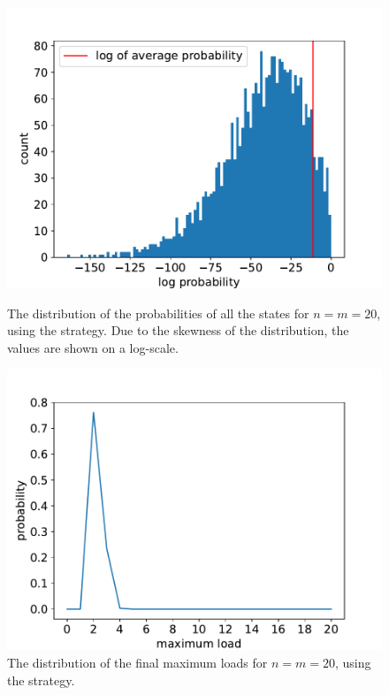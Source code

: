 \begin{figure}
\centering
\begin{minipage}[t]{.48\linewidth}
  \centering
  \includegraphics[scale=0.5]{Chapter4/Figs/state_distribution_20_20_all_log_count.pdf}
  \caption{The distribution of the probabilities of all the states for $n=m=20$, using the \DP strategy. Due to the skewness of the distribution, the values are shown on a log-scale.}
  \label{two-thinning-dp-state-distribution}
\end{minipage}\hfill
\begin{minipage}[t]{.48\linewidth}
  \centering
  \includegraphics[scale=0.5]{Chapter4/Figs/max_load_distribution_20_20.pdf}
  \caption{The distribution of the final maximum loads for $n=m=20$, using the \DP strategy.}
  \label{two-thinning-dp-maxload-distribution}
\end{minipage}
\end{figure}


